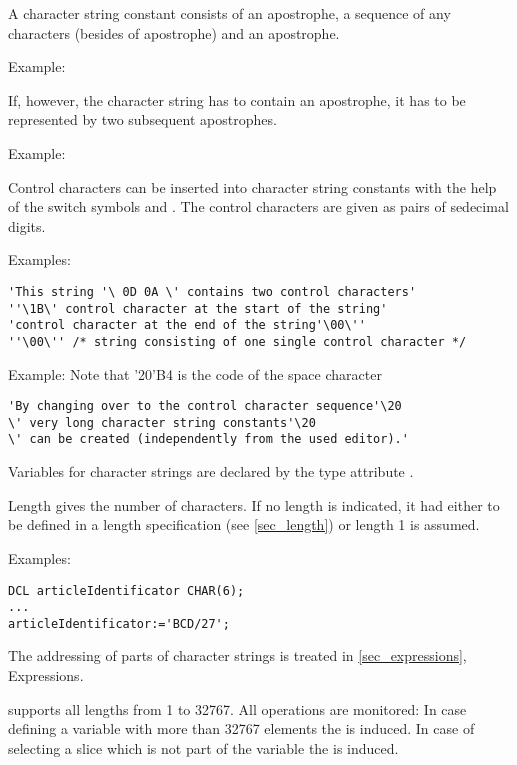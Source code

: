 A character string constant consists of an apostrophe, a sequence of any
characters (besides of apostrophe) and an apostrophe.

Example: 

If, however, the character string has to contain an apostrophe, it has
to be represented by two subsequent apostrophes.

Example: 

Control characters can be inserted into character string constants with
the help of the switch symbols  and 
. 
 The control characters are given as pairs of sedecimal digits.

Examples:

\begin{lstlisting}[emphstyle=\ttfamily]
'This string '\ 0D 0A \' contains two control characters'
''\1B\' control character at the start of the string'
'control character at the end of the string'\00\''
''\00\'' /* string consisting of one single control character */
\end{lstlisting}

Example: Note that '20'B4 is the code of the space character

\begin{lstlisting}
'By changing over to the control character sequence'\20
\' very long character string constants'\20
\' can be created (independently from the used editor).'
\end{lstlisting}

Variables for character strings are declared by the type attribute
.

\begin{grammarframe}

\end{grammarframe}

Length gives the number of characters. If no length is indicated, it had
either to be defined in a length specification (see \ref{sec_length}) or length 1 is
assumed.

Examples:

\begin{lstlisting}
DCL articleIdentificator CHAR(6);
...
articleIdentificator:='BCD/27';
\end{lstlisting}

The addressing of parts of character strings is treated in
 \ref{sec_expressions}, Expressions.

\OpenPEARL{} supports all lengths from 1 to 32767.
All operations are monitored:
In case defining a  variable with more than 32767 elements the
 is induced.
In case of selecting a slice which is not part of the  variable the 
 is induced.

